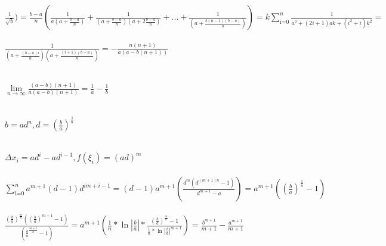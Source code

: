 \documentclass{article}
\begin{document}
$\frac{1}{\sqrt{b}}) = \frac{b-a}{n}(\frac{1}{a(a + \frac{b-a}{n})}+ \frac{1}{(a + \frac{b - a}{n})(a+2\frac{b-a}{n})} + ... + \frac{1}{(a + \frac{b(n-1)(b-a)}{n})}) = k\sum_\text{i=0}^n\frac{1}{a^{2}+(2i+1)ak+(i^{2}+i)k^{2}}=$\\\\

$\frac{1}{(a+\frac{(b-a)i}{n})(a+\frac{(i+1)(b-a)}{n})} = -\frac{n(n+1)}{a(a-b(n+1))}$\\\\

\begin{center}
\end{center}

\begin{left}
    $\lim\limits_{n\to \infty}\frac{(a-b)(n+1)}{a(a-b)(n+1)} = \frac{1}{a} - \frac{1}{b}$\\\\
\end{left}

\begin{center}
\end{center}

\begin{center}
\end{center}

\begin{center}
\end{center}

\begin{left}
    $b = ad^{n}, d = (\frac{b}{a})^{\frac{1}{n}}$\\\\
\end{left}

$\Delta x_i = ad^{i} - ad^{i - 1}, f(\xi_i) = (ad)^{m}$\\\\

$\sum_\text{i=0}^n a^{m+1}(d - 1)d^{im+i-1}=(d-1)a^{m+1}(\frac{d^{m}(d^{(m+1)n}-1)}{d^{m+1}-a}) = a^{m+1}((\frac{b}{a})^{\frac{1}{n}}-1)$\\\\

$\frac{(\frac{b}{a})^{\frac{m}{n}}((\frac{b}{a})^{m+1}-1)}{(\frac{b}{a}^{\frac{m+1}{n}}-1)}=a^{m+1}(\frac{1}{n}*\ln|\frac{b}{a}|*\frac{(\frac{b}{a})^{\frac{m}{n}} - 1}{\frac{1}{n}*\ln|\frac{b}{a}|^{m+1}}) = \frac{b^{m+1}}{m+1} - \frac{a^{m+1}}{m+1}$
\end{document}
